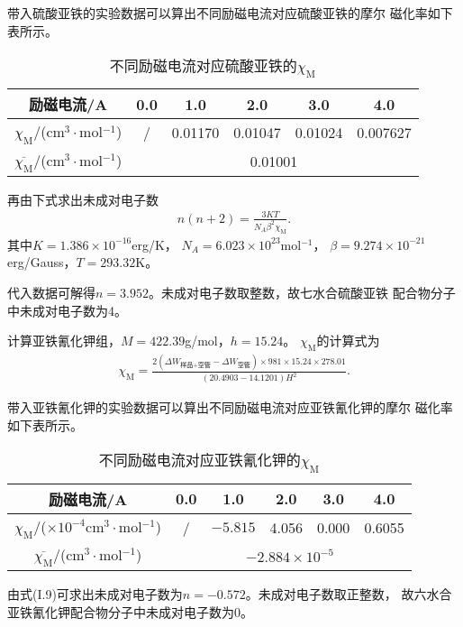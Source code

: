 \documentclass[12pt]{ctexart}
\numberwithin{equation}{section}
\begin{document}
带入硫酸亚铁的实验数据可以算出不同励磁电流对应硫酸亚铁的摩尔
磁化率如下表所示。
\vspace{1cm}
\begin{longtable}{c|ccccc}
    \caption{不同励磁电流对应硫酸亚铁的$\chi_\text{M}$} \\
    \hline
    励磁电流/A & 0.0 & 1.0 & 2.0 & 3.0 & 4.0 \\
    \hline
    $\chi_\text{M}$/(cm$^3\cdot$mol$^{-1}$) & / &
        0.01170 & 0.01047 & 0.01024 & 0.007627 \\
    \hline
    $\overline{\chi_\text{M}}$/(cm$^3\cdot$mol$^{-1}$) &
        \multicolumn{5}{c}{0.01001} \\
    \hline
\end{longtable}

再由下式求出未成对电子数
\begin{align}
    n(n+2) = \frac{3KT}{N_A \beta^2 \chi_\text{M}}.
    \tag{I.9}
\end{align}
其中$K = 1.386\times 10^{-16}$erg/K，
$N_A = 6.023\times 10^{23}$mol$^{-1}$，
$\beta = 9.274\times 10^{-21}$erg/Gauss，$T = 293.32$K。

代入数据可解得$n = 3.952$。未成对电子数取整数，故七水合硫酸亚铁
配合物分子中未成对电子数为4。

计算亚铁氰化钾组，$M = 422.39$g/mol，$h = 15.24$。
$\chi_\text{M}$的计算式为
\begin{align}
    \chi_\text{M}
    = \frac{2(\Delta W_\text{样品+空管}-\Delta W_\text{空管})
                \times 981\times 15.24\times 278.01}
            {(20.4903-14.1201)H^2}. \tag{I.10}
\end{align}

带入亚铁氰化钾的实验数据可以算出不同励磁电流对应亚铁氰化钾的摩尔
磁化率如下表所示。
\vspace{1cm}
\begin{longtable}{c|ccccc}
    \caption{不同励磁电流对应亚铁氰化钾的$\chi_\text{M}$} \\
    \hline
    励磁电流/A & 0.0 & 1.0 & 2.0 & 3.0 & 4.0 \\
    \hline
    $\chi_\text{M}$/($\times 10^{-4}$cm$^3\cdot$mol$^{-1}$) &
        / & $-5.815$ & 4.056 & 0.000 & 0.6055 \\
    \hline
    $\overline{\chi_\text{M}}$/(cm$^3\cdot$mol$^{-1}$) &
        \multicolumn{5}{c}{$-2.884\times 10^{-5}$} \\
    \hline
\end{longtable}

由式(I.9)可求出未成对电子数为$n = -0.572$。未成对电子数取正整数，
故六水合亚铁氰化钾配合物分子中未成对电子数为0。
\end{document}
